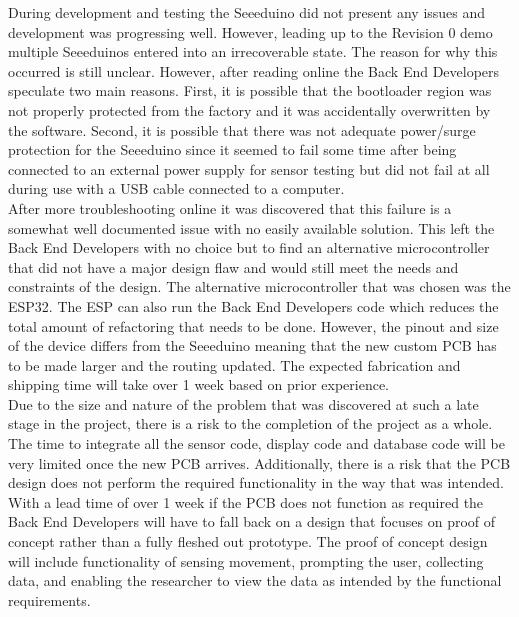 \documentclass[12pt, titlepage]{article}
\begin{document}
During development and testing the Seeeduino did not present any issues and development was progressing well. However, leading up to the Revision 0 demo multiple Seeeduinos entered into an irrecoverable state. The reason for why this occurred is still unclear. However, after reading online the Back End Developers speculate two main reasons. First, it is possible that the bootloader region was not properly protected from the factory and it was accidentally overwritten by the software. Second, it is possible that there was not adequate power/surge protection for the Seeeduino since it seemed to fail some time after being connected to an external power supply for sensor testing but did not fail at all during use with a USB cable connected to a computer. \\

After more troubleshooting online it was discovered that this failure is a somewhat well documented issue with no easily available solution. This left the Back End Developers with no choice but to find an alternative microcontroller that did not have a major design flaw and would still meet the needs and constraints of the design. The alternative microcontroller that was chosen was the ESP32. The ESP can also run the Back End Developers code which reduces the total amount of refactoring that needs to be done. However, the pinout and size of the device differs from the Seeeduino meaning that the new custom PCB has to be made larger and the routing updated. The expected fabrication and shipping time will take over 1 week based on prior experience. \\

Due to the size and nature of the problem that was discovered at such a late stage in the project, there is a risk to the completion of the project as a whole. The time to integrate all the sensor code, display code and database code will be very limited once the new PCB arrives. Additionally, there is a risk that the PCB design does not perform the required functionality in the way that was intended. With a lead time of over 1 week if the PCB does not function as required the Back End Developers will have to fall back on a design that focuses on proof of concept rather than a fully fleshed out prototype. The proof of concept design will include functionality of sensing movement, prompting the user, collecting data, and enabling the researcher to view the data as intended by the functional requirements. \\
\end{document}
